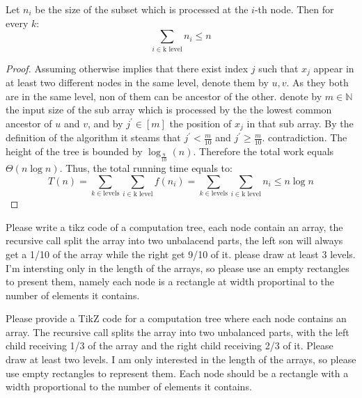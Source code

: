 \begin{example}
\begin{claim}
Let \(n_i\) be the size of the subset which is processed at the \(i\)-th node. Then for every \(k\):
\begin{equation*}
    \sum_{i \in \text{k level}}{n_i} \le n
\end{equation*}
\end{claim}
\begin{proof} Assuming otherwise implies that there exist index \(j\) such that \(x_j\) appear in at least two different nodes in the same level, denote them by \(u,v\). As they both are in the same level, non of them can be ancestor of the other. denote by \(m \in \mathbb{N}\) the input size of the sub array which is processed by the the lowest common ancestor of \(u\) and \(v\), and by \(j^\prime \in [m]\) the position of \(x_j\) in that sub array. By the definition of the algorithm it steams that \(j^\prime < \frac{m}{10} \) and \(j^\prime \ge \frac{m}{10}\). contradiction.  The height of the tree is bounded by \( \log_{\frac{9}{10}} \left(n\right) \). Therefore the total work equals \( \Theta \left( n\log n \right) \). Thus, the total running time equals to:
\begin{equation*}
    T(n) = \sum_{k \in \text{levels}}{\sum_{i \in \text{k level}}{f\left(n_i\right)}} = \sum_{k \in \text{levels}}{\sum_{i \in \text{k level}}{n_i}} \le n\log n  
\end{equation*}
\end{proof}
\end{example}



Please write a tikz code of a computation tree, each node contain an array, the recursive call split the array into two unbalacend parts, the left son will always get a 1/10 of the array while the right get 9/10 of it. please draw at least 3 levels. I'm intersting only in the length of the arrays, so please use an empty rectangles to present them, namely each node is a rectangle at width proportinal to the number of elements it contains.   

Please provide a TikZ code for a computation tree where each node contains an array. The recursive call splits the array into two unbalanced parts, with the left child receiving 1/3 of the array and the right child receiving 2/3 of it. Please draw at least two levels. I am only interested in the length of the arrays, so please use empty rectangles to represent them. Each node should be a rectangle with a width proportional to the number of elements it contains.  
	
